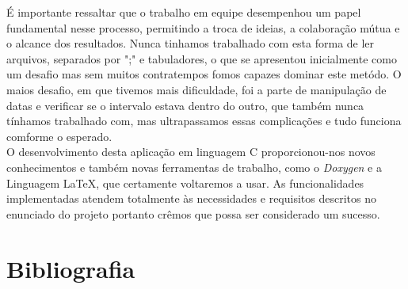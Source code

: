 \documentclass{article}
\begin{document}
É importante ressaltar que o trabalho em equipe desempenhou um papel fundamental nesse processo, permitindo a troca de ideias, a colaboração mútua e o alcance dos resultados. Nunca tinhamos trabalhado com esta forma de ler arquivos, separados por ";" e tabuladores, o que se apresentou inicialmente como um desafio mas sem muitos contratempos fomos capazes dominar este metódo. O maios desafio, em que tivemos mais dificuldade, foi a parte de manipulação de datas e verificar se o intervalo estava dentro do outro, que também nunca tínhamos trabalhado com, mas ultrapassamos essas complicações e tudo funciona comforme o esperado.\\

O desenvolvimento desta aplicação em linguagem C \cite{Online} proporcionou-nos novos conhecimentos e também novas ferramentas de trabalho, como o \emph{Doxygen}\cite{Doxygen} e a Linguagem \LaTeX \cite{Documentação}, que certamente voltaremos a usar. As funcionalidades implementadas atendem totalmente às necessidades e requisitos descritos no enunciado do projeto portanto crêmos que possa ser considerado um sucesso.

\section{Bibliografia}



\end{document}
